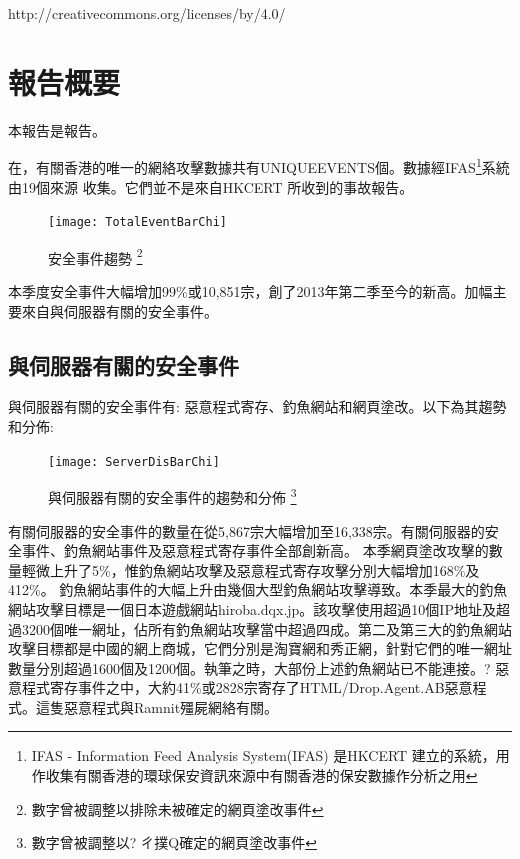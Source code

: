 \documentclass[14pt]{extarticle}
\begin{document}
http://creativecommons.org/licenses/by/4.0/

\clearpage
\tableofcontents
\clearpage

\section*{報告概要}
本報告是報告。

在，有關香港的唯一的網絡攻擊數據共有UNIQUEEVENTS個。數據經IFAS\footnote{IFAS - Information Feed Analysis System(IFAS) 是HKCERT 建立的系統，用作收集有關香港的環球保安資訊來源中有關香港的保安數據作分析之用}系統由19個來源 收集。它們並不是來自HKCERT 所收到的事故報告。

\begin{figure}[h!]
\centerline{\texttt{[image: TotalEventBarChi]}}
\caption{安全事件趨勢
{\protect\footnote{數字曾被調整以排除未被確定的網頁塗改事件}}}
\end{figure}

本季度安全事件大幅增加99\%或10,851宗，創了2013年第二季至今的新高。加幅主要來自與伺服器有關的安全事件。

\subsection*{與伺服器有關的安全事件}

與伺服器有關的安全事件有: 惡意程式寄存、釣魚網站和網頁塗改。以下為其趨勢和分佈:

\begin{figure}[h!]
\centerline{\texttt{[image: ServerDisBarChi]}}
\caption{與伺服器有關的安全事件的趨勢和分佈
{\protect\footnote{數字曾被調整以?ㄔ撲Q確定的網頁塗改事件}}}
\end{figure}
有關伺服器的安全事件的數量在從5,867宗大幅增加至16,338宗。有關伺服器的安全事件、釣魚網站事件及惡意程式寄存事件全部創新高。
本季網頁塗改攻擊的數量輕微上升了5\%，惟釣魚網站攻擊及惡意程式寄存攻擊分別大幅增加168\%及412\%。
釣魚網站事件的大幅上升由幾個大型釣魚網站攻擊導致。本季最大的釣魚網站攻擊目標是一個日本遊戲網站hiroba.dqx.jp。該攻擊使用超過10個IP地址及超過3200個唯一網址，佔所有釣魚網站攻擊當中超過四成。第二及第三大的釣魚網站攻擊目標都是中國的網上商城，它們分別是淘寶網和秀正網，針對它們的唯一網址數量分別超過1600個及1200個。執筆之時，大部份上述釣魚網站已不能連接。?
惡意程式寄存事件之中，大約41\%或2828宗寄存了HTML/Drop.Agent.AB惡意程式。這隻惡意程式與Ramnit殭屍網絡有關。
\end{document}
